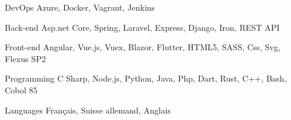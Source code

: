 

\begin{cvskills}

  \cvskill
    {DevOps} %
    {Azure, Docker, Vagrant, Jenkins} %

  \cvskill
    {Back-end} %
    {Asp.net Core, Spring, Laravel, Express, Django, Iron, REST API} %

  \cvskill
    {Front-end} %
    {Angular, Vue.js, Vuex, Blazor, Flutter, HTML5, SASS, Css, Svg, Flexus SP2} %

  \cvskill
    {Programming} %
    {C Sharp, Node.js, Python, Java, Php, Dart, Rust, C++, Bash, Cobol 85} %

  \cvskill
    {Languages} %
    {Français, Suisse allemand, Anglais} %

\end{cvskills}
